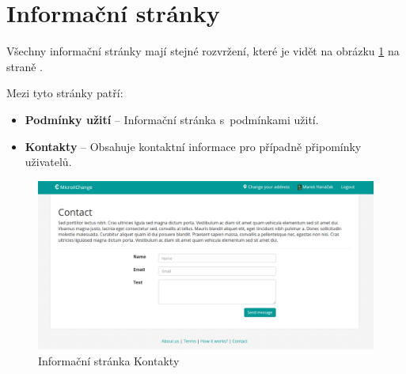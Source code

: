 \section{Informační stránky}
\label{nur:other-sections}

Všechny informační stránky mají stejné rozvržení, které je vidět na obrázku \ref{fig:tur:contact} na straně \pageref{fig:tur:contact}.

Mezi tyto stránky patří:
\begin{itemize}
    \item \textbf{Podmínky užití} -- Informační stránka s~podmínkami užití.
    \item \textbf{Kontakty} -- Obsahuje kontaktní informace pro případně připomínky uživatelů.
\end{itemize}

\begin{figure}[!h]
    \centering
    \includegraphics[width=1.0\textwidth]{media/tur/contact.png}
    \caption{Informační stránka Kontakty}
    \label{fig:tur:contact}
\end{figure}